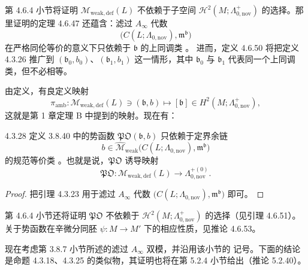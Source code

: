 第 4.6.4 小节将证明
$\mathcal M_{\mathrm{weak,def}}(L)$ 不依赖于子空间
$\mathcal H^2(M;\Lambda^+_{0,\mathrm{nov}})$ 的选择。那里证明的定理
4.6.47 还蕴含：滤过 $A_\infty$ 代数
\[
 \bigl(C(L;\Lambda_{0,\mathrm{nov}}),\mathfrak m^{\mathfrak b}\bigr)
\]
在严格同伦等价的意义下只依赖于 $\mathfrak b$ 的上同调类
。
进而，定义 4.6.50 将把定义 4.3.26 推广到
$(\mathfrak b_0,b_0)$、$(\mathfrak b_1,b_1)$ 这一情形，其中
$\mathfrak b_0$ 与 $\mathfrak b_1$ 代表同一个上同调类，但不必相等。

由定义，有良定义映射
\begin{equation}
 \pi_{\mathrm{amb}}\colon
 \mathcal M_{\mathrm{weak,def}}(L)
 \ni(\mathfrak b,b)
 \longmapsto[\mathfrak b]
 \in H^2(M;\Lambda^+_{0,\mathrm{nov}}),
\tag{4.3.27}\label{eq:4-3-27}
\end{equation}
这就是第 1 章定理 B 中提到的映射。现在有：

\begin{lemma}{4.3.28}\label{lem:4-3-28}
定义 3.8.40 中的势函数 $\mathfrak{PO}(\mathfrak b,b)$ 只依赖于定界余链
\[
 b\in\widehat{\mathcal M}_{\mathrm{weak}}
 \bigl(C(L;\Lambda_{0,\mathrm{nov}}),\mathfrak m^{\mathfrak b}\bigr)
\]
的规范等价类
。也就是说，$\mathfrak{PO}$ 诱导映射
\[
 \mathfrak{PO}\colon
 \mathcal M_{\mathrm{weak,def}}(L)
 \longrightarrow\Lambda^{+(0)}_{0,\mathrm{nov}}.
\]
\end{lemma}

\begin{proof}
把引理 4.3.23 用于滤过 $A_\infty$ 代数
$\bigl(C(L;\Lambda_{0,\mathrm{nov}}),\mathfrak m^{\mathfrak b}\bigr)$
即可。
\end{proof}

第 4.6.4 小节还将证明 $\mathfrak{PO}$ 不依赖于
$\mathcal H^2(M;\Lambda^+_{0,\mathrm{nov}})$ 的选择（见引理
4.6.51）。关于势函数在辛微分同胚
$\psi\colon M\to M'$ 下的相应性质，见推论 4.6.53。

现在考虑第 3.8.7 小节所述的滤过 $A_\infty$ 双模，并沿用该小节的
记号。下面的结论是命题 4.3.18、4.3.25 的类似物，其证明也将在第
5.2.4 小节给出（推论 5.2.40）。

